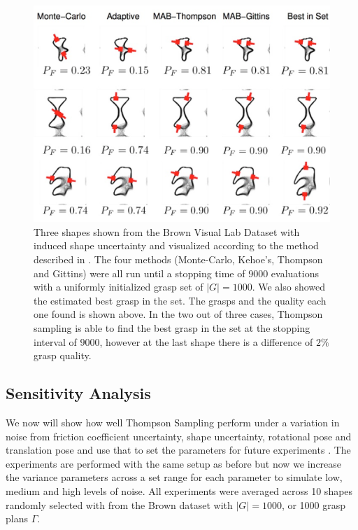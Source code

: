 \documentclass[a4paper, 10pt, conference]{ieeeconf}      %
\begin{document}
\begin{figure}%
\label{fig:shape_examples}
    \centering
    \includegraphics[width=16.5cm]{figures/shapes.png}%
  
    \caption{Three shapes shown from the Brown Visual Lab Dataset with induced shape uncertainty and visualized according to the method described in \cite{mahler2015gp}. The four methods (Monte-Carlo, Kehoe's, Thompson and Gittins) were all run until a stopping time of 9000 evaluations with a uniformly initialized grasp set of $|G|=1000$. We also showed the estimated best grasp in the set.  The grasps and the quality each one found is shown above.  In the two out of three cases, Thompson sampling is able to find the best grasp in the set at the stopping interval of $9000$, however at the last shape there is a difference of $2\%$ grasp quality.   }%
    \label{fig:shape_samples}%
\end{figure}


\subsection{Sensitivity Analysis }\label{sec:sensitivity}
We now will show how well  Thompson Sampling perform under a variation in noise from friction coefficient uncertainty, shape uncertainty, rotational pose and translation pose and use that to set the parameters for future experiments . The experiments are performed with the same setup as before but now we increase the variance parameters across a set range for each parameter to simulate low, medium and high levels of noise. All experiments were averaged across 10 shapes randomly selected with from the Brown dataset with $|G| = 1000$, or 1000 grasp plans $\Gamma$. 
\end{document}

